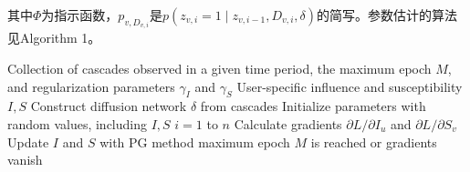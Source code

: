 \documentclass[UTF8]{ctexart}
\begin{document}
其中$\Phi$为指示函数，$p_{v,D_{v,i}}$是$p(z_{v,i}=1\mid z_{v,i-1}, D_{v,i},\delta)$的简写。参数估计的算法见Algorithm 1。
\begin{codebox}[\indent ]
\zi {} Collection of cascades observed in a given time period, the maximum epoch $M$, 
\zi and regularization parameters $\gamma_{I}$ and $\gamma_{S}$
\zi {} User-specific influence and susceptibility $I,S$
\zi
\zi Construct diffusion network $\delta$ from cascades
\zi Initialize parameters with random values, including $I,S$
\zi \Indentmore {}
\zi \Indentmore {} $i=1$ to $n$ 
\zi   Calculate gradients $\partial L/ \partial I_{u}$ and $\partial L/ \partial S_{v}$
    \End 
\zi Update $I$ and $S$ with PG method
    \End 
\zi {} maximum epoch $M$ is reached or gradients vanish
\end{codebox}
\end{document}
